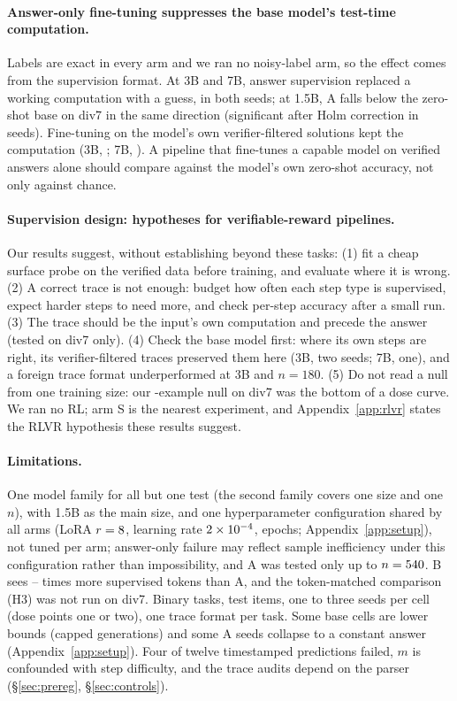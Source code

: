 \documentclass{article}
\theoremstyle{definition}
\begin{document}
\paragraph{Answer-only fine-tuning suppresses the base model's test-time computation.} Labels are exact in every arm and we ran no noisy-label arm, so the effect comes from the supervision format. At 3B and 7B, answer supervision replaced a working computation with a guess, in both seeds; at 1.5B, A falls below the zero-shot base on div7 in the same direction (significant after Holm correction in \divsevenABaseHolmSig{} seeds). Fine-tuning on the model's own verifier-filtered solutions kept the computation (3B, \threeBdivsevenSSeedTxt; 7B, \sevenBdivsevenSSeedTxt). A pipeline that fine-tunes a capable model on verified answers alone should compare against the model's own zero-shot accuracy, not only against chance.

\paragraph{Supervision design: hypotheses for verifiable-reward pipelines.} Our results suggest, without establishing beyond these tasks: (1) fit a cheap surface probe on the verified data before training, and evaluate where it is wrong. (2) A correct trace is not enough: budget how often each step type is supervised, expect harder steps to need more, and check per-step accuracy after a small run. (3) The trace should be the input's own computation and precede the answer (tested on div7 only). (4) Check the base model first: where its own steps are right, its verifier-filtered traces preserved them here (3B, two seeds; 7B, one), and a foreign trace format underperformed at 3B and $n=180$. (5) Do not read a null from one training size: our \nTrainSmall-example null on div7 was the bottom of a dose curve. We ran no RL; arm S is the nearest experiment, and Appendix~\ref{app:rlvr} states the RLVR hypothesis these results suggest.

\paragraph{Limitations.} One model family for all but one test (the second family covers one size and one $n$), with 1.5B as the main size, and one hyperparameter configuration shared by all arms (LoRA $r=8$, learning rate $2\times 10^{-4}$, \nEpochs{} epochs; Appendix~\ref{app:setup}), not tuned per arm; answer-only failure may reflect sample inefficiency under this configuration rather than impossibility, and A was tested only up to $n=540$. B sees \tokRatioLow--\tokRatioHigh{} times more supervised tokens than A, and the token-matched comparison (H3) was not run on div7. Binary tasks, \nTest{} test items, one to three seeds per cell (dose points one or two), one trace format per task. Some base cells are lower bounds (capped generations) and some A seeds collapse to a constant answer (Appendix~\ref{app:setup}). Four of twelve timestamped predictions failed, $m$ is confounded with step difficulty, and the trace audits depend on the parser (\S\ref{sec:prereg}, \S\ref{sec:controls}).
\end{document}
